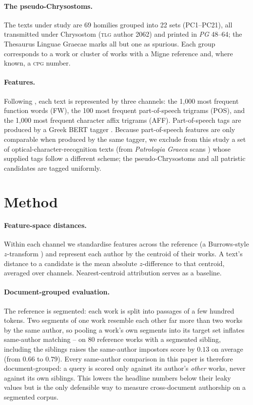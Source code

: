 \documentclass{anthology-ch}
\begin{document}
\paragraph{The pseudo-Chrysostoms.} The texts under study are 69 homilies grouped into 22 sets (PC1--PC21), all transmitted under Chrysostom (\textsc{tlg} author 2062) and printed in \emph{PG} 48--64; the Thesaurus Linguae Graecae marks all but one as spurious. Each group corresponds to a work or cluster of works with a Migne reference and, where known, a \textsc{cpg} number.

\paragraph{Features.} Following \textcite{clerice2023}, each text is represented by three channels: the 1{,}000 most frequent function words (FW), the 100 most frequent part-of-speech trigrams (POS), and the 1{,}000 most frequent character affix trigrams (AFF). Part-of-speech tags are produced by a Greek BERT tagger \cite{superpeitho}. Because part-of-speech features are only comparable when produced by the same tagger, we exclude from this study a set of optical-character-recognition texts (from \emph{Patrologia Graeca} scans \cite{pgcorpus}) whose supplied tags follow a different scheme; the pseudo-Chrysostoms and all patristic candidates are tagged uniformly.

\section{Method}

\paragraph{Feature-space distances.} Within each channel we standardise features across the reference (a Burrows-style $z$-transform \cite{burrows2002}) and represent each author by the centroid of their works. A text's distance to a candidate is the mean absolute $z$-difference to that centroid, averaged over channels. Nearest-centroid attribution serves as a baseline.

\paragraph{Document-grouped evaluation.} The reference is segmented: each work is split into passages of a few hundred tokens. Two segments of one work resemble each other far more than two works by the same author, so pooling a work's own segments into its target set inflates same-author matching -- on 80 reference works with a segmented sibling, including the siblings raises the same-author impostors score by $0.13$ on average (from $0.66$ to $0.79$). Every same-author comparison in this paper is therefore document-grouped: a query is scored only against its author's \emph{other} works, never against its own siblings. This lowers the headline numbers below their leaky values but is the only defensible way to measure cross-document authorship on a segmented corpus.
\end{document}
